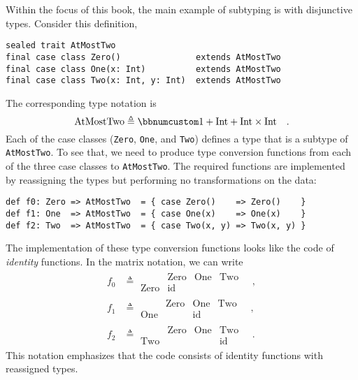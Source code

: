 Within the focus of this book, the main example of subtyping is with
disjunctive types. Consider this definition,
\begin{lstlisting}
sealed trait AtMostTwo
final case class Zero()               extends AtMostTwo
final case class One(x: Int)          extends AtMostTwo
final case class Two(x: Int, y: Int)  extends AtMostTwo
\end{lstlisting}
The corresponding type notation is 
\[
\text{AtMostTwo}\triangleq\bbnum 1+\text{Int}+\text{Int}\times\text{Int}\quad.
\]
Each of the case classes (\lstinline!Zero!, \lstinline!One!, and
\lstinline!Two!) defines a type that is a subtype of \lstinline!AtMostTwo!.
To see that, we need to produce type conversion functions from each
of the three case classes to \lstinline!AtMostTwo!. The required
functions are implemented by reassigning the types but performing
no transformations on the data:
\begin{lstlisting}
def f0: Zero => AtMostTwo  = { case Zero()    => Zero()    }
def f1: One  => AtMostTwo  = { case One(x)    => One(x)    }
def f2: Two  => AtMostTwo  = { case Two(x, y) => Two(x, y) }
\end{lstlisting}
The implementation of these type conversion functions looks like the
code of \emph{identity} functions. In the matrix notation, we can
write
\begin{align*}
f_{0} & \triangleq\begin{array}{|c||ccc|}
 & \text{Zero} & \text{One} & \text{Two}\\
\hline \text{Zero} & \text{id} &  & 
\end{array}\quad,\\
f_{1} & \triangleq\begin{array}{|c||ccc|}
 & \text{Zero} & \text{One} & \text{Two}\\
\hline \text{One} &  & \text{id} & 
\end{array}\quad,\\
f_{2} & \triangleq\begin{array}{|c||ccc|}
 & \text{Zero} & \text{One} & \text{Two}\\
\hline \text{Two} &  &  & \text{id}
\end{array}\quad.
\end{align*}
This notation emphasizes that the code consists of identity functions
with reassigned types.

